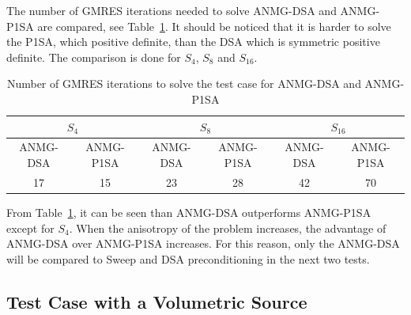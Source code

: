 \documentclass[preprint,10pt]{elsarticle}
\renewcommand{\(}{\left(}
\renewcommand{\)}{\right)}
\renewcommand{\[}{\left[}
\renewcommand{\]}{\right]}
\newcommand{\tbl}[1]{Table~\ref{#1}}                     %
\begin{document}
The number of GMRES iterations needed to solve ANMG-DSA and
ANMG-P1SA are compared, see \tbl{tab:1}. It should be noticed that it is
harder to solve the P1SA, which positive definite, than the DSA which is
symmetric positive definite. The comparison is done for $S_4$, $S_8$ and
$S_{16}$. 
\begin{table}[H]
\begin{center}
\begin{tabular}{|c|c|c|c|c|c|}
\hline
\multicolumn{2}{|c|}{$S_4$} & \multicolumn{2}{c|}{$S_8$} &
\multicolumn{2}{c|}{$S_{16}$}\\
\hline
ANMG-DSA & ANMG-P1SA & ANMG-DSA & ANMG-P1SA & ANMG-DSA & ANMG-P1SA\\
\hline
17 &  15 & 23 & 28 & 42 & 70\\
\hline
\end{tabular}
\caption{Number of GMRES iterations to solve the test case for ANMG-DSA and
ANMG-P1SA}
\label{tab:1}
\end{center}
\end{table}
%
From \tbl{tab:1}, it can be seen than ANMG-DSA outperforms ANMG-P1SA except for
$S_4$. When the anisotropy of the problem increases, the advantage of ANMG-DSA
over ANMG-P1SA increases. For this reason, only the ANMG-DSA will be compared
to Sweep and DSA preconditioning in the next two tests.

\subsection{Test Case with a Volumetric Source}
\end{document}
